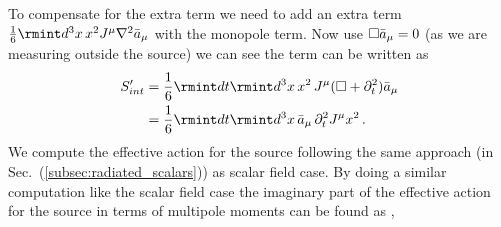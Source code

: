 To compensate for the extra term we need to add an extra term $\frac{1}{6}\rmint d^3 x\, x^2 J^{\mu}\nabla^2\Bar{a}_{\mu}$ with the monopole term. Now use $\Box \Bar{a}_{\mu}=0$ (as we are measuring outside the source) we can see the term can be written as
\begin{align}
    \begin{split}
        S_{int}'&=\frac{1}{6}\rmint dt \rmint d^3 x\, x^2\,J^\mu (\Box+\partial_{t}^2)\Bar{a}_{\mu}\\ &
        =\frac{1}{6}\rmint dt\rmint d^3x\,\Bar{a}_{\mu}\, \partial_{t}^2 J^{\mu} x^2\,.
    \end{split}
\end{align}
We compute the effective action for the source  following the same approach (in Sec.~(\ref{subsec:radiated_scalars})) as scalar field case. By doing a similar computation like the scalar field case the imaginary part of the effective action for the source in terms of multipole moments can be found as  \cite{Kuntz:2019zef}, 
